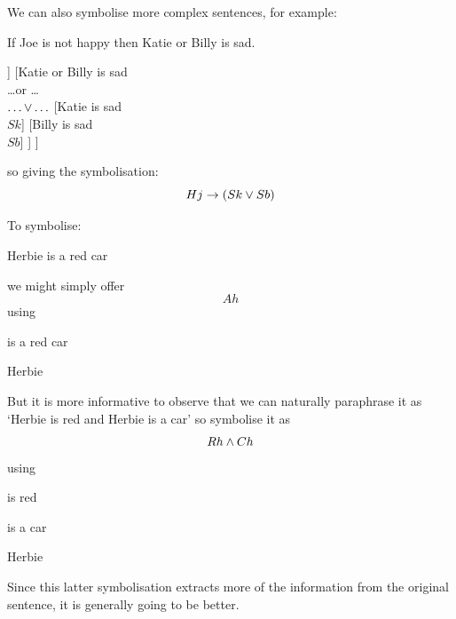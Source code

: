 We can also symbolise more complex sentences, for example:
\begin{samplesent}
\item\label{sent:folcomplex} If Joe is not happy then Katie or Billy is sad.
\begin{center}
	\begin{forest}
		[If Joe is not happy then Katie or Billy is sad\\If \ldots then \ldots\\$\ldots {\eif} \ldots$
		[Joe is not happy\\It is not the case that \ldots\\${\enot} \ldots$
		[Joe is happy\\$Hj$]
		]
		[Katie or Billy is sad\\\ldots or \ldots\\$\ldots {\ensuremath{\vee}} \ldots$
		[Katie is sad\\$Sk$]
		[Billy is sad\\$Sb$]
		]
		]
	\end{forest}
\end{center}
\end{samplesent}
so giving the symbolisation: $$Hj\rightarrow(Sk\vee Sb)$$

To symbolise:
\begin{samplesent}
\item\label{sent:folredcar} Herbie is a red car
\end{samplesent}
we might simply offer
$$Ah$$
using
\begin{ekey}
\item[Ax] is a red car
\item[h] Herbie
\end{ekey}
But it is more informative to observe that we can naturally paraphrase it as `Herbie is red and Herbie is a car' so symbolise it as
$$Rh\mathbin{\wedge} Ch$$
using
\begin{ekey}
\item[Rx] is red
\item[Cx]  is a car
\item[h] Herbie
\end{ekey}
Since this latter symbolisation extracts more of the information from the original sentence, it is generally going to be better.

